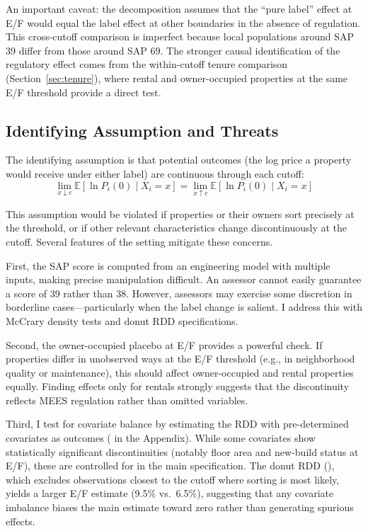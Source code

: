 \documentclass[12pt]{article}
\newcommand{\E}{\mathbb{E}}
\begin{document}
An important caveat: the decomposition assumes that the ``pure label'' effect at E/F would equal the label effect at other boundaries in the absence of regulation. This cross-cutoff comparison is imperfect because local populations around SAP 39 differ from those around SAP 69. The stronger causal identification of the regulatory effect comes from the within-cutoff tenure comparison (Section~\ref{sec:tenure}), where rental and owner-occupied properties at the same E/F threshold provide a direct test.

\subsection{Identifying Assumption and Threats}

The identifying assumption is that potential outcomes (the log price a property would receive under either label) are continuous through each cutoff:
\begin{equation}
\lim_{x \downarrow c} \E[\ln P_i(0) \mid X_i = x] = \lim_{x \uparrow c} \E[\ln P_i(0) \mid X_i = x]
\end{equation}

This assumption would be violated if properties or their owners sort precisely at the threshold, or if other relevant characteristics change discontinuously at the cutoff. Several features of the setting mitigate these concerns.

First, the SAP score is computed from an engineering model with multiple inputs, making precise manipulation difficult. An assessor cannot easily guarantee a score of 39 rather than 38. However, assessors may exercise some discretion in borderline cases---particularly when the label change is salient. I address this with McCrary density tests and donut RDD specifications.

Second, the owner-occupied placebo at E/F provides a powerful check. If properties differ in unobserved ways at the E/F threshold (e.g., in neighborhood quality or maintenance), this should affect owner-occupied and rental properties equally. Finding effects only for rentals strongly suggests that the discontinuity reflects MEES regulation rather than omitted variables.

Third, I test for covariate balance by estimating the RDD with pre-determined covariates as outcomes ( in the Appendix). While some covariates show statistically significant discontinuities (notably floor area and new-build status at E/F), these are controlled for in the main specification. The donut RDD (), which excludes observations closest to the cutoff where sorting is most likely, yields a larger E/F estimate (9.5\% vs.\ 6.5\%), suggesting that any covariate imbalance biases the main estimate toward zero rather than generating spurious effects.
\end{document}

